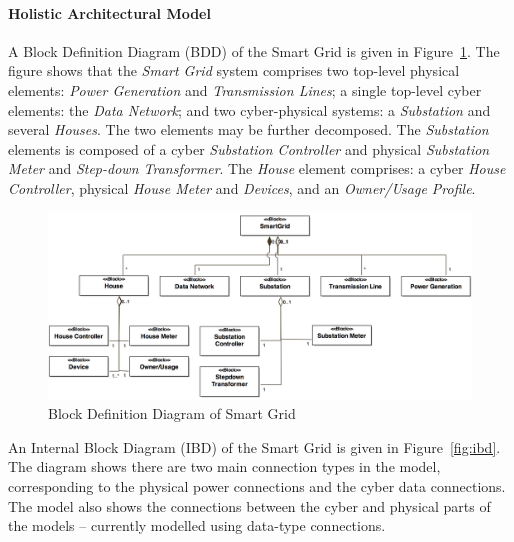 \paragraph{Holistic Architectural Model}

A Block Definition Diagram (BDD) of the Smart Grid is given in Figure~\ref{fig:bdd}. The figure shows that the \textit{Smart Grid} system comprises two top-level physical elements: \textit{Power Generation} and \textit{Transmission Lines}; a single top-level cyber elements: the \textit{Data Network}; and two cyber-physical systems: a \textit{Substation} and several \textit{Houses}. The two elements may be further decomposed. The \textit{Substation} elements is composed of a cyber \textit{Substation Controller} and physical \textit{Substation Meter} and \textit{Step-down Transformer}. The \textit{House} element comprises: a cyber \textit{House Controller}, physical \textit{House Meter} and \textit{Devices}, and an \textit{Owner/Usage Profile}.

\begin{figure}
\centering
\includegraphics[width=1\textwidth]{figures/BDDSmartGrid}
\caption{Block Definition Diagram of Smart Grid}
\label{fig:bdd}
\end{figure}

An Internal Block Diagram (IBD) of the Smart Grid is given in Figure~\ref{fig:ibd}. The diagram shows there are two main connection types in the model, corresponding to the physical power connections and the cyber data connections. The model also shows the connections between the cyber and physical parts of the models -- currently modelled using data-type connections.

